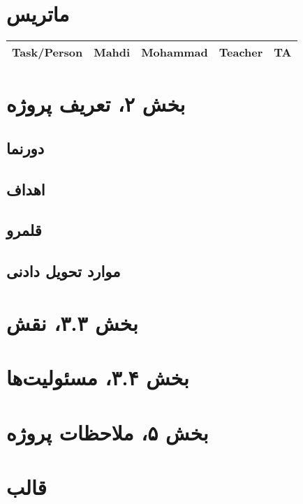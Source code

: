 \documentclass[11pt, oneside]{book}
\begin{document}
\frontmatter

\tableofcontents
\mainmatter

\chapter{ماتریس }
\begin{table}[H]
\begin{latin}
\begin{center}
\begin{tabular}{|c|c|c|c|c|}
\hline
Task/Person & Mahdi & Mohammad & Teacher & TA \\
\hline
\end{tabular}
\end{center}
\end{latin}
\end{table}

\chapter{بخش ۲، تعریف پروژه\\}
\section{دورنما }
\section{اهداف }
\section{قلمرو }
\section{موارد تحویل دادنی }

\chapter{بخش ۳.۳، نقش\\}

\chapter{بخش ۳.۴، مسئولیت‌ها\\}

\chapter{بخش ۵، ملاحظات پروژه\\}

\chapter{قالب }
\end{document}
